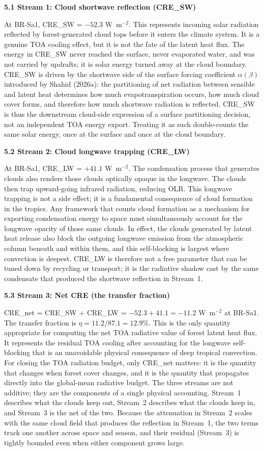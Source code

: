 \textbf{5.1 Stream 1: Cloud shortwave reflection (CRE\_SW)}

At BR-Sa1, CRE\_SW = $-52.3$ W~m$^{-2}$. This represents incoming
solar radiation reflected by forest-generated cloud tops before it
enters the climate system. It is a genuine TOA cooling effect, but it
is not the fate of the latent heat flux. The energy in CRE\_SW never
reached the surface, never evaporated water, and was not carried by
updrafts; it is solar energy turned away at the cloud boundary.
CRE\_SW is driven by the shortwave side of the surface forcing
coefficient $\alpha(\beta)$ introduced by Shahid (2026a): the
partitioning of net radiation between sensible and latent heat
determines how much evapotranspiration occurs, how much cloud cover
forms, and therefore how much shortwave radiation is reflected.
CRE\_SW is thus the downstream cloud-side expression of a surface
partitioning decision, not an independent TOA energy export. Treating
it as such double-counts the same solar energy, once at the surface
and once at the cloud boundary.

\textbf{5.2 Stream 2: Cloud longwave trapping (CRE\_LW)}

At BR-Sa1, CRE\_LW = $+41.1$ W~m$^{-2}$. The condensation process
that generates clouds also renders those clouds optically opaque in
the longwave. The clouds then trap upward-going infrared radiation,
reducing OLR. This longwave trapping is not a side effect; it is a
fundamental consequence of cloud formation in the tropics. Any
framework that counts cloud formation as a mechanism for exporting
condensation energy to space must simultaneously account for the
longwave opacity of those same clouds. In effect, the clouds
generated by latent heat release also block the outgoing longwave
emission from the atmospheric column beneath and within them, and
this self-blocking is largest where convection is deepest. CRE\_LW is
therefore not a free parameter that can be tuned down by recycling or
transport; it is the radiative shadow cast by the same condensate
that produced the shortwave reflection in Stream~1.

\textbf{5.3 Stream 3: Net CRE (the transfer fraction)}

CRE\_net = CRE\_SW + CRE\_LW = $-52.3 + 41.1 = -11.2$ W~m$^{-2}$ at
BR-Sa1. The transfer fraction is $\eta = 11.2 / 87.1 = 12.9\%$. This
is the only quantity appropriate for computing the net TOA radiative
value of forest latent heat flux. It represents the residual TOA
cooling after accounting for the longwave self-blocking that is an
unavoidable physical consequence of deep tropical convection. For
closing the TOA radiation budget, only CRE\_net matters: it is the
quantity that changes when forest cover changes, and it is the
quantity that propagates directly into the global-mean radiative
budget. The three streams are not additive; they are the components
of a single physical accounting. Stream~1 describes what the clouds
keep out, Stream~2 describes what the clouds keep in, and Stream~3
is the net of the two. Because the attenuation in Stream~2 scales
with the same cloud field that produces the reflection in Stream~1,
the two terms track one another across space and season, and their
residual (Stream~3) is tightly bounded even when either component
grows large.

